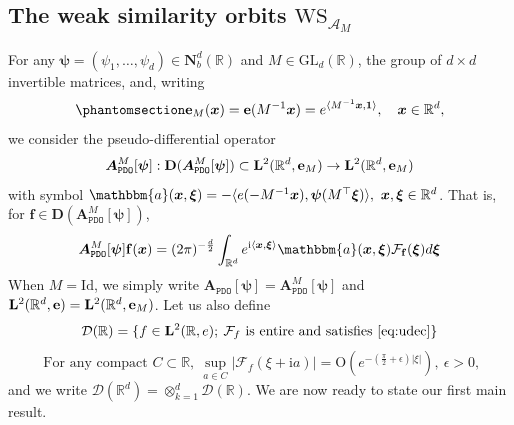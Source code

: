 \documentclass[12pt]{amsart}
\newcommand{\hlabel}{\phantomsection\label}
\numberwithin{equation}{section}
\newcommand{\bb}{\mathbb}
\newcommand{\cc}{\mathcal}
\newcommand{\hpt}[2]{#2}
\newcommand{\bbm}{\mathbbm}
\newcommand{\ttt}{\mathtt}
\newcommand{\bmrm}[2][2]{\mathbf{#2}^{#1}}
\newcommand{\fou}{\mathcal{F}}
\newcommand{\AM}{\bm{A}^M}
\newcommand{\D}{\mathbf{D}}
\newcommand{\eps}{\epsilon}
\renewcommand{\i}{\mathrm{i}}
\newcommand{\LRe}{\bmrm{L}(\bb{R},e)}
\newcommand{\f}{\mathbf{f}}
\newcommand{\ccA}{\mathscr{A}}
\newcommand{\cD}{\mathcal{D}}
\theoremstyle{definition}
\theoremstyle{assump}
\theoremstyle{remark}
\begin{document}
\subsection{The weak similarity orbits $\mathrm{WS}_{\ccA_M}$}\hlabel{ss:WS_PDO}
For any $\bm{\psi}=(\psi_1,\ldots,\psi_d)\in\mathbf{N}^d_b(\bb{R})$ and  $M\in\mathrm{GL}_d(\bb{R})$, the group of $d\times d$ invertible matrices, and, writing
\begin{equation}\hlabel{eq:defeb}
	{\mathbf{e}}_M(\bm{x})={\mathbf{e}}(M^{-1}\bm{x})=e^{\langle M^{-1}\bm{x},\bm{1}\rangle}, \quad \bm{x} \in \bb{R}^d,
\end{equation}
we consider the  pseudo-differential operator
\begin{equation*}
  \bm{A}^M_{\ttt{PDO}}[\bm{\psi}] : \D(\bm{A}^M_{\ttt{PDO}}[\bm{\psi}]) \subset \bmrm{L}(\bb{R}^d,{\bf e}_M) \to \bmrm{L}(\bb{R}^d,{\bf e}_M)
\end{equation*}
with symbol $\bbm{a}(\bm{x},\bm{\xi})=-\langle e(-M^{-1}\bm x),\bm{\psi}(M^\top\bm{\xi})\rangle, \ \bm{x},\bm{\xi}\in\bb R^d$. That is, for $\f\in\D(\bm{A}^M_{\ttt{PDO}}[\bm{\psi}])$,
\begin{align*}
	\bm{A}^M_{\ttt{PDO}}[\bm{\psi}]\f(\bm x)=(2\pi)^{-\frac{d}{2}}\int_{\bb{R}^d} e^{\i\langle \bm x, \bm \xi\rangle} \bbm{a}(\bm{x},\bm{\xi})\fou_{\f}(\bm\xi) d\bm{\xi}
\end{align*}
When  $M=\mathrm{Id}$, we simply write $\bm{A}_\ttt{PDO}[\bm\psi]=\AM_\ttt{PDO}[\bm\psi]$ and $\bmrm{L}(\bb{R}^d,{\bf e})=\bmrm{L}(\bb{R}^d,{\bf e}_M)$. Let us also define
\begin{equation*}
 \cc{D}(\bb R) = \{f\in \LRe;\: \cc{F}_f \textrm{ is entire and satisfies \eqref{eq:udec}}\}
\end{equation*}
\begin{equation} \label{eq:udec}
\hpt{R4}{\textrm{ For any compact } C \subset \bb{R},\: \sup_{a \in C}|\cc{F}_f(\xi+\i a)|=\mathrm{O}(e^{-(\frac{\pi}{2}+\eps)|\xi|}),\: \epsilon>0,}
	\end{equation}
and we write $\bm{\cD}(\bb R^d)=\otimes_{k=1}^d\cD(\bb R)$. We are now ready to state our first main result.
\end{document}
